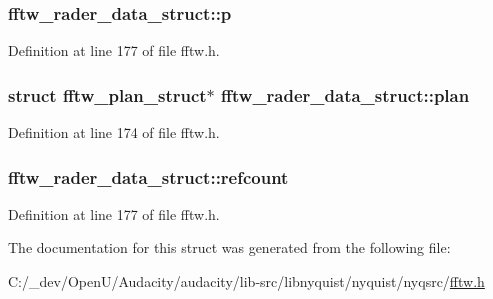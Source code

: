 \subsubsection[{\texorpdfstring{p}{p}}]{ fftw\+\_\+rader\+\_\+data\+\_\+struct\+::p}\hypertarget{structfftw__rader__data__struct_a7c62f135742d0c0a3303950f78421815}{}\label{structfftw__rader__data__struct_a7c62f135742d0c0a3303950f78421815}


Definition at line 177 of file fftw.\+h.

\subsubsection[{\texorpdfstring{plan}{plan}}]{\setlength{\rightskip}{0pt plus 5cm}struct {\bf fftw\+\_\+plan\+\_\+struct}$\ast$ fftw\+\_\+rader\+\_\+data\+\_\+struct\+::plan}\hypertarget{structfftw__rader__data__struct_aa0fdaee84fabe8a6ecb74ea4a05ab122}{}\label{structfftw__rader__data__struct_aa0fdaee84fabe8a6ecb74ea4a05ab122}


Definition at line 174 of file fftw.\+h.

\subsubsection[{\texorpdfstring{refcount}{refcount}}]{ fftw\+\_\+rader\+\_\+data\+\_\+struct\+::refcount}\hypertarget{structfftw__rader__data__struct_ae8416156b430120934321df66227c97f}{}\label{structfftw__rader__data__struct_ae8416156b430120934321df66227c97f}


Definition at line 177 of file fftw.\+h.



The documentation for this struct was generated from the following file\+:\begin{DoxyCompactItemize}
\item 
C\+:/\+\_\+dev/\+Open\+U/\+Audacity/audacity/lib-\/src/libnyquist/nyquist/nyqsrc/\hyperlink{fftw_8h}{fftw.\+h}\end{DoxyCompactItemize}
